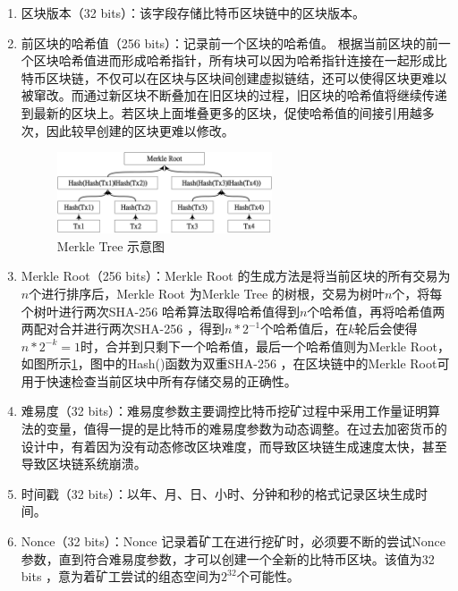 				\begin{enumerate}
				\item 区块版本（32 bits）：该字段存储比特币区块链中的区块版本。
				\item 前区块的哈希值（256 bits）：记录前一个区块的哈希值。 根据当前区块的前一个区块哈希值进而形成哈希指针，所有块可以因为哈希指针连接在一起形成比特币区块链，不仅可以在区块与区块间创建虚拟链结，还可以使得区块更难以被窜改。而通过新区块不断叠加在旧区块的过程，旧区块的哈希值将继续传递到最新的区块上。若区块上面堆叠更多的区块，促使哈希值的间接引⽤越多次，因此较早创建的区块更难以修改。

				\begin{figure}[!htbp]
					\centering
					\includegraphics[width = 0.6\textwidth]{MerkleRoot.jpg}
					\caption{Merkle Tree 示意图}\label{MerkleRoot}
				\end{figure}

				\item Merkle Root（256 bits）：Merkle Root 的生成方法是将当前区块的所有交易为$n$个进行排序后，Merkle Root 为Merkle Tree 的树根，交易为树叶$n$个，将每个树叶进行两次SHA-256 哈希算法取得哈希值得到$n$个哈希值，再将哈希值两两配对合并进行两次SHA-256 ，得到$n*2^{-1}$个哈希值后，在$k$轮后会使得$n*2^{-k}=1$时，合并到只剩下一个哈希值，最后一个哈希值则为Merkle Root，如图所示\ref{MerkleRoot}，图中的Hash()函数为双重SHA-256 ，在区块链中的Merkle Root可用于快速检查当前区块中所有存储交易的正确性。

				

				\item 难易度（32 bits）：难易度参数主要调控比特币挖矿过程中采用工作量证明算法的变量，值得一提的是比特币的难易度参数为动态调整。在过去加密货币的设计中，有着因为没有动态修改区块难度，而导致区块链生成速度太快，甚至导致区块链系统崩溃。
				\item 时间戳（32 bits）：以年、月、日、小时、分钟和秒的格式记录区块生成时间。
				\item Nonce（32 bits）：Nonce 记录着矿工在进行挖矿时，必须要不断的尝试Nonce 参数，直到符合难易度参数，才可以创建一个全新的比特币区块。该值为32 bits ，意为着矿工尝试的组态空间为$2^{32}$个可能性。
				\end{enumerate}
				
